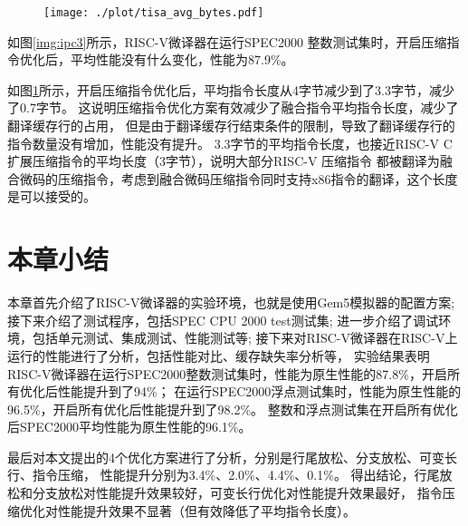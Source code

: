 \begin{figure}[!htbp]
  \centering
  \texttt{[image: ./plot/tisa\_avg\_bytes.pdf]}
  \label{img:avg_bytes}
\end{figure}


如图\ref{img:ipc3}所示，RISC-V微译器在运行SPEC2000 整数测试集时，开启压缩指令优化后，平均性能没有什么变化，性能为87.9\%。

如图\ref{img:avg_bytes}所示，开启压缩指令优化后，平均指令长度从4字节减少到了3.3字节，减少了0.7字节。
这说明压缩指令优化方案有效减少了融合指令平均指令长度，减少了翻译缓存行的占用，
但是由于翻译缓存行结束条件的限制，导致了翻译缓存行的指令数量没有增加，性能没有提升。
3.3字节的平均指令长度，也接近RISC-V C扩展压缩指令的平均长度（3字节），说明大部分RISC-V 压缩指令
都被翻译为融合微码的压缩指令，考虑到融合微码压缩指令同时支持x86指令的翻译，这个长度是可以接受的。


\section{本章小结}

本章首先介绍了RISC-V微译器的实验环境，也就是使用Gem5模拟器的配置方案;
接下来介绍了测试程序，包括SPEC CPU 2000 test测试集;
进一步介绍了调试环境，包括单元测试、集成测试、性能测试等;
接下来对RISC-V微译器在RISC-V上运行的性能进行了分析，包括性能对比、缓存缺失率分析等，
实验结果表明RISC-V微译器在运行SPEC2000整数测试集时，性能为原生性能的87.8\%，开启所有优化后性能提升到了94\%；
在运行SPEC2000浮点测试集时，性能为原生性能的96.5\%，开启所有优化后性能提升到了98.2\%。
整数和浮点测试集在开启所有优化后SPEC2000平均性能为原生性能的96.1\%。

最后对本文提出的4个优化方案进行了分析，分别是行尾放松、分支放松、可变长行、指令压缩，
性能提升分别为3.4\%、2.0\%、4.4\%、0.1\%。
得出结论，行尾放松和分支放松对性能提升效果较好，可变长行优化对性能提升效果最好，
指令压缩优化对性能提升效果不显著（但有效降低了平均指令长度）。